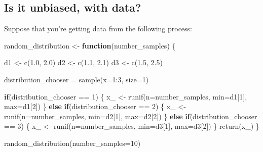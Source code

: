 \documentclass[
]{book}
\newenvironment{Shaded}{\begin{snugshade}}{\end{snugshade}}
\newcommand{\AttributeTok}[1]{\textcolor[rgb]{0.77,0.63,0.00}{#1}}
\newcommand{\ControlFlowTok}[1]{\textcolor[rgb]{0.13,0.29,0.53}{\textbf{#1}}}
\newcommand{\DecValTok}[1]{\textcolor[rgb]{0.00,0.00,0.81}{#1}}
\newcommand{\FloatTok}[1]{\textcolor[rgb]{0.00,0.00,0.81}{#1}}
\newcommand{\FunctionTok}[1]{\textcolor[rgb]{0.00,0.00,0.00}{#1}}
\newcommand{\NormalTok}[1]{#1}
\newcommand{\OtherTok}[1]{\textcolor[rgb]{0.56,0.35,0.01}{#1}}
\newcommand{\SpecialCharTok}[1]{\textcolor[rgb]{0.00,0.00,0.00}{#1}}
\theoremstyle{definition}
\theoremstyle{definition}
\theoremstyle{definition}
\theoremstyle{definition}
\theoremstyle{remark}
\begin{document}
\hypertarget{is-it-unbiased-with-data}{%
\subsection{Is it unbiased, with data?}\label{is-it-unbiased-with-data}}

Suppose that you're getting data from the following process:

\begin{Shaded}
\begin{Highlighting}[]
\NormalTok{random\_distribution }\OtherTok{\textless{}{-}} \ControlFlowTok{function}\NormalTok{(number\_samples) \{ }
  
\NormalTok{  d1 }\OtherTok{\textless{}{-}} \FunctionTok{c}\NormalTok{(}\FloatTok{1.0}\NormalTok{, }\FloatTok{2.0}\NormalTok{)}
\NormalTok{  d2 }\OtherTok{\textless{}{-}} \FunctionTok{c}\NormalTok{(}\FloatTok{1.1}\NormalTok{, }\FloatTok{2.1}\NormalTok{)}
\NormalTok{  d3 }\OtherTok{\textless{}{-}} \FunctionTok{c}\NormalTok{(}\FloatTok{1.5}\NormalTok{, }\FloatTok{2.5}\NormalTok{)}

\NormalTok{  distribution\_chooser }\OtherTok{=} \FunctionTok{sample}\NormalTok{(}\AttributeTok{x=}\DecValTok{1}\SpecialCharTok{:}\DecValTok{3}\NormalTok{, }\AttributeTok{size=}\DecValTok{1}\NormalTok{)}
  
  \ControlFlowTok{if}\NormalTok{(distribution\_chooser }\SpecialCharTok{==} \DecValTok{1}\NormalTok{) \{ }
\NormalTok{    x\_ }\OtherTok{\textless{}{-}} \FunctionTok{runif}\NormalTok{(}\AttributeTok{n=}\NormalTok{number\_samples, }\AttributeTok{min=}\NormalTok{d1[}\DecValTok{1}\NormalTok{], }\AttributeTok{max=}\NormalTok{d1[}\DecValTok{2}\NormalTok{])  }
\NormalTok{  \} }\ControlFlowTok{else} \ControlFlowTok{if}\NormalTok{(distribution\_chooser }\SpecialCharTok{==} \DecValTok{2}\NormalTok{) \{ }
\NormalTok{    x\_ }\OtherTok{\textless{}{-}} \FunctionTok{runif}\NormalTok{(}\AttributeTok{n=}\NormalTok{number\_samples, }\AttributeTok{min=}\NormalTok{d2[}\DecValTok{1}\NormalTok{], }\AttributeTok{max=}\NormalTok{d2[}\DecValTok{2}\NormalTok{]) }
\NormalTok{  \} }\ControlFlowTok{else} \ControlFlowTok{if}\NormalTok{(distribution\_chooser }\SpecialCharTok{==} \DecValTok{3}\NormalTok{) \{ }
\NormalTok{    x\_ }\OtherTok{\textless{}{-}} \FunctionTok{runif}\NormalTok{(}\AttributeTok{n=}\NormalTok{number\_samples, }\AttributeTok{min=}\NormalTok{d3[}\DecValTok{1}\NormalTok{], }\AttributeTok{max=}\NormalTok{d3[}\DecValTok{2}\NormalTok{])}
\NormalTok{  \}}
  \FunctionTok{return}\NormalTok{(x\_)}
\NormalTok{\}}

\FunctionTok{random\_distribution}\NormalTok{(}\AttributeTok{number\_samples=}\DecValTok{10}\NormalTok{)}
\end{Highlighting}
\end{Shaded}
\end{document}
